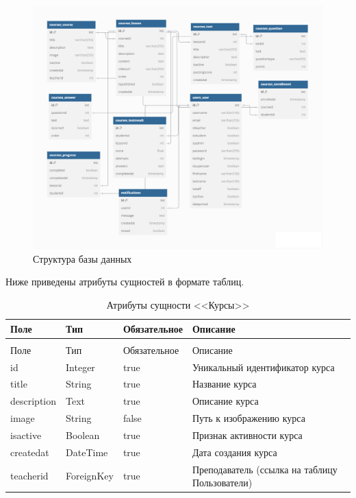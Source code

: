 \begin{landscape}
	\begin{figure}[ht]
		\centering
		\includegraphics[width=1.2\textwidth]{images/бд} 
		\caption{Структура базы данных}
		\label{bd:image}
	\end{figure}
\end{landscape}

Ниже приведены атрибуты сущностей в формате таблиц.

\begin{xltabular}{\textwidth}{|l|l|p{3.2cm}|X|}
	\caption{Атрибуты сущности <<Курсы>>\label{courses:table}}\\ \hline
	Поле & Тип & Обязательное & Описание \\ \hline
	\endfirsthead
	\\ \hline
	Поле & Тип & Обязательное & Описание \\ \hline
	\endhead
	id & Integer & true & Уникальный идентификатор курса \\ \hline
	title & String & true & Название курса \\ \hline
	description & Text & true & Описание курса \\ \hline
	image & String & false & Путь к изображению курса \\ \hline
	isactive & Boolean & true & Признак активности курса \\ \hline
	createdat & DateTime & true & Дата создания курса \\ \hline
	teacherid & ForeignKey & true & Преподаватель (ссылка на таблицу Пользователи) \\ \hline
\end{xltabular}

